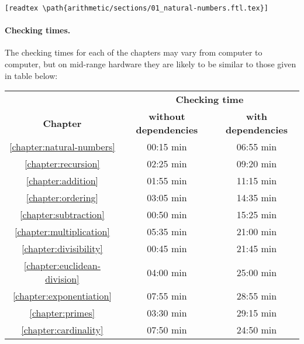 \documentclass[12pt,oneside]{book}
\begin{document}
  \begin{center}
    \verb`[readtex \path{arithmetic/sections/01_natural-numbers.ftl.tex}]`
  \end{center}

  \paragraph*{Checking times.}
  The checking times for each of the chapters may vary from computer to
  computer, but on mid-range hardware they are likely to be similar to those
  given in table below:

  \begin{center}
    \begin{tabular}{c|c|c}

      & \multicolumn{2}{c}{\textbf{Checking time}}
      \\
      \textbf{Chapter}
      & \textbf{without dependencies}     & \textbf{with dependencies}
      \\ \hline
      \ref{chapter:natural-numbers}
      & 00:15 min                         & 06:55 min
      \\
      \ref{chapter:recursion}
      & 02:25 min                         & 09:20 min
      \\
      \ref{chapter:addition}
      & 01:55 min                         & 11:15 min
      \\
      \ref{chapter:ordering}
      & 03:05 min                         & 14:35 min
      \\
      \ref{chapter:subtraction}
      & 00:50 min                         & 15:25 min
      \\
      \ref{chapter:multiplication}
      & 05:35 min                         & 21:00 min
      \\
      \ref{chapter:divisibility}
      & 00:45 min                         & 21:45 min
      \\
      \ref{chapter:euclidean-division}
      & 04:00 min                         & 25:00 min
      \\
      \ref{chapter:exponentiation}
      & 07:55 min                         & 28:55 min
      \\
      \ref{chapter:primes}
      & 03:30 min                         & 29:15 min
      \\
      \ref{chapter:cardinality}
      & 07:50 min                         & 24:50 min
    \end{tabular}
  \end{center}


  
  
  
  
  
  
  
  
  
  
  
\end{document}
